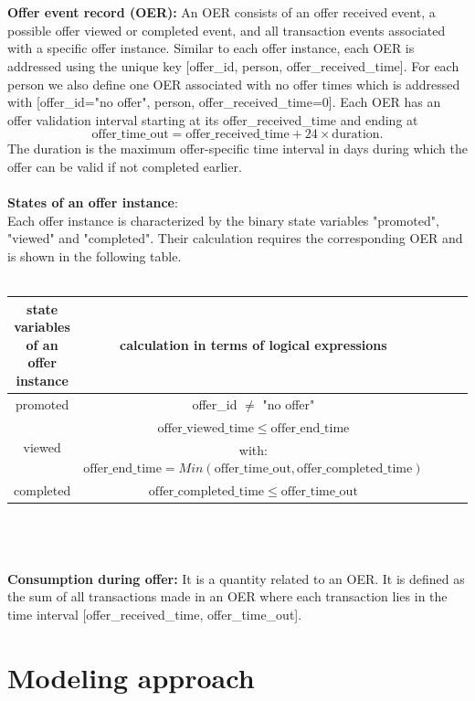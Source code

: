 \documentclass[11pt]{article} %
\begin{document}
\\
\\
\textbf{Offer event record (OER): }An OER consists of an offer received event, a possible offer viewed or completed event, and all transaction events associated with a specific offer instance.
Similar to each offer instance, each OER is addressed using the unique key [offer\_id, person, offer\_received\_time].
For each person we also define one OER associated with no offer times which is addressed with [offer\_id="no offer", person, offer\_received\_time=0].
Each OER has an offer validation interval starting at its offer\_received\_time and ending at $$\mathrm{offer\_time\_out}=\mathrm{offer\_received\_time}+24 \times \mathrm{duration}.$$ 
The duration is the maximum offer-specific time interval in days during which the offer can be valid if not completed earlier.
\\
\\
\textbf{States of an offer instance}: 
\\
Each offer instance is characterized by the binary state variables "promoted", "viewed" and "completed".
Their calculation requires the corresponding OER and is shown in the following table.
\\
\\
\begin{tabular}{|c||c|c|c|c|}
 \hline
\textbf{state variables of an offer instance} & \textbf{calculation in terms of logical expressions} \\ 
\hline
\hline
promoted & offer\_id $\ne$ "no offer"\\ 
\hline
\multirow{ 2}{*}{viewed} &  $\mathrm{offer\_viewed\_time} \le \mathrm{offer\_end\_time}$\\ 
&  with: $ \mathrm{offer\_end\_time}=Min(\mathrm{offer\_time\_out},\mathrm{ offer\_completed\_time})$\\ 
\hline
completed & $\mathrm{ offer\_completed\_time} \le \mathrm{offer\_time\_out} $ \\ 
\hline
\end{tabular}
\\
\\
\\
\textbf{Consumption during offer:}
It is a quantity related to an OER.
It is defined as the sum of all transactions made in an OER where each transaction lies in the time interval [offer\_received\_time, offer\_time\_out].


\section{Modeling approach}
\end{document}
